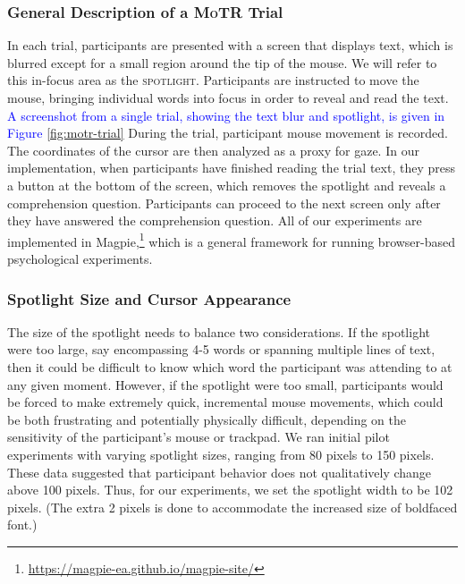 \documentclass[12pt]{article}
\newcommand{\motr}{\textsc{MoTR}\xspace}
\newcommand{\defn}[1]{\textsc{#1}}
\newcommand{\change}[1]{\textcolor{blue}{#1}}
\begin{document}
\subsubsection{General Description of a \motr Trial}


In each trial, participants are presented with a screen that displays text, which is blurred except for a small region around the tip of the mouse. We will refer to this in-focus area as the \defn{spotlight}. Participants are instructed to move the mouse, bringing individual words into focus in order to reveal and read the text. \change{A screenshot from a single trial, showing the text blur and spotlight, is given in Figure \ref{fig:motr-trial}} During the trial, participant mouse movement is recorded. The coordinates of the cursor are then analyzed as a proxy for gaze. In our implementation, when participants have finished reading the trial text, they press a button at the bottom of the screen, which removes the spotlight and reveals a comprehension question. Participants can proceed to the next screen only after they have answered the comprehension question. All of our experiments are implemented in Magpie,\footnote{\url{https://magpie-ea.github.io/magpie-site/}} which is a general framework for running browser-based psychological experiments.

\subsubsection{Spotlight Size and Cursor Appearance}

The size of the spotlight needs to balance two considerations. If the spotlight were too large, say encompassing 4-5 words or spanning multiple lines of text, then it could be difficult to know which word the participant was attending to at any given moment. However, if the spotlight were too small, participants would be forced to make extremely quick, incremental mouse movements, which could be both frustrating and potentially physically difficult, depending on the sensitivity of the participant's mouse or trackpad. We ran initial pilot experiments with varying spotlight sizes, ranging from 80 pixels to 150 pixels. These data suggested that participant behavior does not qualitatively change above 100 pixels. Thus, for our experiments, we set the spotlight width to be 102 pixels. (The extra 2 pixels is done to accommodate the increased size of boldfaced font.)
 
\end{document}
